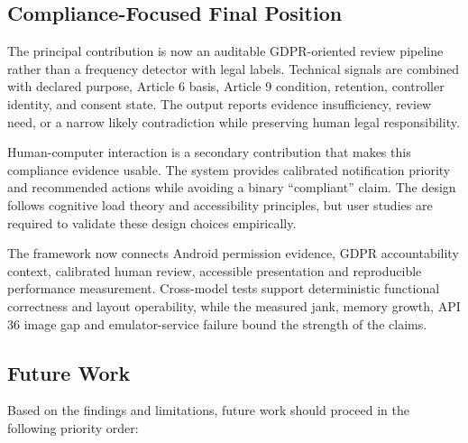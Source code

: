 \subsection{Compliance-Focused Final Position}

The principal contribution is now an auditable GDPR-oriented review pipeline rather than a frequency detector with legal labels. Technical signals are combined with declared purpose, Article 6 basis, Article 9 condition, retention, controller identity, and consent state. The output reports evidence insufficiency, review need, or a narrow likely contradiction while preserving human legal responsibility.

Human-computer interaction is a secondary contribution that makes this compliance evidence usable. The system provides calibrated notification priority and recommended actions while avoiding a binary ``compliant'' claim. The design follows cognitive load theory and accessibility principles, but user studies are required to validate these design choices empirically.

The framework now connects Android permission evidence, GDPR accountability context, calibrated human review, accessible presentation and reproducible performance measurement. Cross-model tests support deterministic functional correctness and layout operability, while the measured jank, memory growth, API 36 image gap and emulator-service failure bound the strength of the claims.

\subsection{Future Work}

Based on the findings and limitations, future work should proceed in the following priority order:

